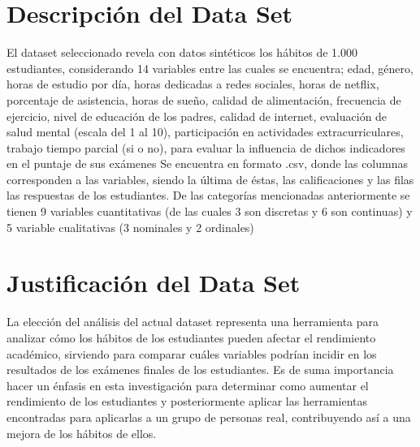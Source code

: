\documentclass[12pt,letterpaper]{report}
\begin{document}
\section{Descripción del Data Set}
El dataset seleccionado revela con datos sintéticos los hábitos de 1.000 estudiantes, considerando 14 variables entre las cuales se encuentra; edad, género, horas de estudio por día, horas dedicadas a redes sociales, horas de netflix, porcentaje de asistencia, horas de sueño, calidad de alimentación, frecuencia de ejercicio, nivel de educación de los padres, calidad de internet, evaluación de salud mental (escala del 1 al 10), participación en actividades extracurriculares, trabajo tiempo parcial (si o no), para evaluar la influencia de dichos indicadores en el puntaje de sus exámenes
Se encuentra en formato .csv, donde las columnas corresponden a las variables, siendo la última de éstas, las calificaciones y las filas las respuestas de los estudiantes. De las categorías mencionadas anteriormente se tienen 9 variables cuantitativas (de las cuales 3 son discretas y 6 son continuas) y 5 variable cualitativas (3 nominales y 2 ordinales)
\section{Justificación del Data Set}
La elección del análisis del actual dataset representa una herramienta para analizar cómo los hábitos de los estudiantes pueden afectar el rendimiento académico, sirviendo para comparar cuáles variables podrían incidir en los resultados de los exámenes finales de los estudiantes. Es de suma importancia hacer un énfasis en esta investigación para determinar como aumentar el rendimiento de los estudiantes y posteriormente aplicar las herramientas encontradas para aplicarlas a un grupo de personas real, contribuyendo así a una mejora de los hábitos de ellos.
\end{document}

